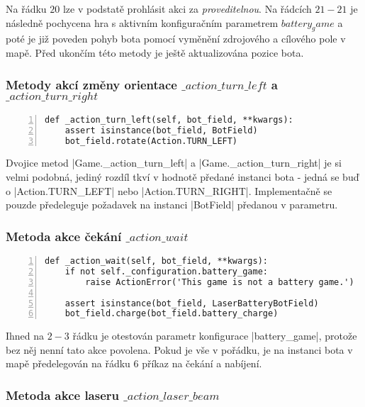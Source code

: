 Na řádku $20$ lze v podstatě prohlásit akci za \emph{proveditelnou}. Na řádcích $21-21$ je následně pochycena hra s aktivním konfiguračním parametrem $battery_game$ a poté je již poveden pohyb bota pomocí vyměnění zdrojového a cílového pole v mapě. Před ukončím této metody je ještě aktualizována pozice bota.

\subsubsection[Metody akcí změny orientace]{Metody akcí změny orientace $\_action\_turn\_left$ a $\_action\_turn\_right$}

\begin{lstlisting}[caption={Metoda $Game.\_action\_turn\_left$},label={lst:game-action-turn-left},numbers=left]
def _action_turn_left(self, bot_field, **kwargs):
    assert isinstance(bot_field, BotField)
    bot_field.rotate(Action.TURN_LEFT)
\end{lstlisting}

Dvojice metod \ic|Game._action_turn_left| a \ic|Game._action_turn_right| je si velmi podobná, jediný rozdíl tkví v hodnotě předané instanci bota - jedná se buď o \ic|Action.TURN_LEFT| nebo \ic|Action.TURN_RIGHT|. Implementačně se pouzde předeleguje požadavek na instanci \ic|BotField| předanou v parametru.

\subsubsection{Metoda akce čekání $\_action\_wait$}

\begin{lstlisting}[caption={Metoda $Game.\_action\_wait$},label={lst:game-action-wait},numbers=left]
def _action_wait(self, bot_field, **kwargs):
    if not self._configuration.battery_game:
        raise ActionError('This game is not a battery game.')

    assert isinstance(bot_field, LaserBatteryBotField)
    bot_field.charge(bot_field.battery_charge)
\end{lstlisting}

Ihned na $2-3$ řádku je otestován parametr konfigurace \ic|battery_game|, protože bez něj nenní tato akce povolena. Pokud je vše v pořádku, je na instanci bota v mapě předelegován na řádku $6$ příkaz na čekání a nabíjení.

\subsubsection{Metoda akce laseru $\_action\_laser\_beam$}

